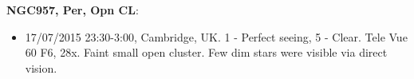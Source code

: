 {\bf NGC957, Per, Opn CL}:
\begin{itemize}
\item 17/07/2015 23:30-3:00, Cambridge, UK. 1 - Perfect seeing, 5 - Clear. Tele Vue 60 F6, 28x. Faint small open cluster. Few dim stars were visible via direct vision.
\end{itemize}
